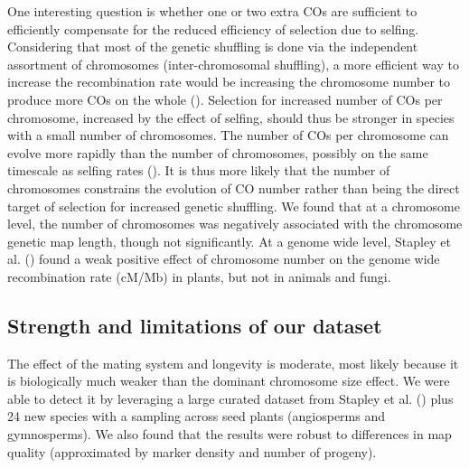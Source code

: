 \documentclass{article}
\begin{document}
One interesting question is whether one or two extra COs are sufficient to efficiently compensate for the reduced efficiency of selection due to selfing. Considering that most of the genetic shuffling is done via the independent assortment of chromosomes (inter-chromosomal shuffling), a more efficient way to increase the recombination rate would be increasing the chromosome number to produce more COs on the whole (\cite{vellerRigorousMeasureGenomewide2019}). Selection for increased number of COs per chromosome, increased by the effect of selfing, should thus be stronger in species with a small number of chromosomes. The number of COs per chromosome can evolve more rapidly than the number of chromosomes, possibly on the same timescale as selfing rates (\cite{hendersonEvolutionPlasticityGenomeWide2021,whiteheadPlantMatingSystems2018}). It is thus more likely that the number of chromosomes constrains the evolution of CO number rather than being the direct target of selection for increased genetic shuffling. We found that at a chromosome level, the number of chromosomes was negatively associated with the chromosome genetic map length, though not significantly. At a genome wide level, Stapley et al. (\citeyear{stapleyVariationRecombinationFrequency2017}) found a weak positive effect of chromosome number on the genome wide recombination rate (cM/Mb) in plants, but not in animals and fungi.


\subsection*{Strength and limitations of our dataset}


The effect of the mating system and longevity is moderate, most likely because it is biologically much weaker than the dominant chromosome size effect. We were able to detect it by leveraging a large curated dataset from Stapley et al. (\citeyear{stapleyVariationRecombinationFrequency2017}) plus 24 new species with a sampling across seed plants (angiosperms and gymnosperms). We also found that the results were robust to differences in map quality (approximated by marker density and number of progeny).
\end{document}
